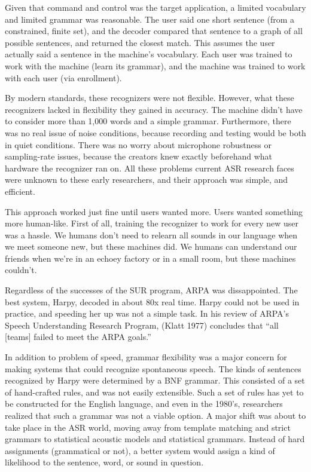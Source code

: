 \documentclass[10pt,a4paper]{article}
\begin{document}
Given that command and control was the target application, a limited vocabulary and limited grammar was reasonable. The user said one short sentence (from a constrained, finite set), and the decoder compared that sentence to a graph of all possible sentences, and returned the closest match. This assumes the user actually said a sentence in the machine's vocabulary. Each user was trained to work with the machine (learn its grammar), and the machine was trained to work with each user (via enrollment). 

By modern standards, these recognizers were not flexible. However, what these recognizers lacked in flexibility they gained in accuracy. The machine didn't have to consider more than 1,000 words and a simple grammar. Furthermore, there was no real issue of noise conditions, because recording and testing would be both in quiet conditions. There was no worry about microphone robustness or sampling-rate issues, because the creators knew exactly beforehand what hardware the recognizer ran on. All these problems current ASR research faces were unknown to these early researchers, and their approach was simple, and efficient.

This approach worked just fine until users wanted more. Users wanted something more human-like. First of all, training the recognizer to work for every new user was a hassle. We humans don't need to relearn all sounds in our language when we meet someone new, but these machines did. We humans can understand our friends when we're in an echoey factory or in a small room, but these machines couldn't.

Regardless of the successes of the SUR program, ARPA was dissappointed. The best system, Harpy, decoded in about 80x real time. Harpy could not be used in practice, and speeding her up was not a simple task. In his review of ARPA's Speech Understanding Research Program, (Klatt 1977) concludes that ``all [teams] failed to meet the ARPA goals.''


In addition to problem of speed, grammar flexibility was a major concern for making systems that could recognize spontaneous speech. The kinds of sentences recognized by Harpy were determined by a BNF grammar. This consisted of a set of hand-crafted rules, and was not easily extensible. Such a set of rules has yet to be constructed for the English language, and even in the 1980's, researchers realized that such a grammar was not a viable option. A major shift was about to take place in the ASR world, moving away from template matching and strict grammars to statistical acoustic models and statistical grammars. Instead of hard assignments (grammatical or not), a better system would assign a kind of likelihood to the sentence, word, or sound in question.
\end{document}
